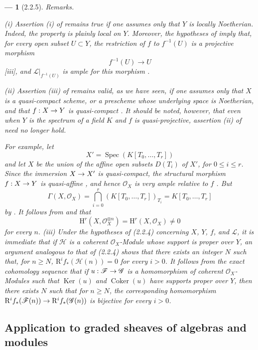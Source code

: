 \documentclass[oneside]{amsart}
\theoremstyle{ega-env-style}
\newtheorem*{env}{---}
\theoremstyle{ega-thm-env-style}
\theoremstyle{ega-defn-env-style}
\def\mathcal{\mathscr}
\def\sh{\mathcal}                   %
\def\leq{\leqslant}                 %
\def\geq{\geqslant}                 %
\def\HH{\mathrm{H}}                 %
\def\RR{\mathrm{R}}                 %
\def\Ker{\operatorname{Ker}}
\def\Coker{\operatorname{Coker}}
\def\Spec{\operatorname{Spec}}
\renewcommand{\to}{\mathchoice{\longrightarrow}{\rightarrow}{\rightarrow}{\rightarrow}}
\let\EGAOriginalLabel\label
\renewcommand{\label}[1]{\phantomsection\EGAOriginalLabel{#1}}
\begin{document}
\begin{env}[2.2.5]
\label{III.2.2.5}
\emph{Remarks.}

(i) Assertion (i) of  remains true if one assumes only that $Y$ is \emph{locally Noetherian}.
Indeed, the property is plainly local on $Y$.
Moreover, the hypotheses of  imply that, for every open subset $U\subset Y$, the restriction of $f$ to $f^{-1}(U)$ is a projective morphism
\[
  f^{-1}(U)\longrightarrow U
\]
[iii], and $\sh{L}|_{f^{-1}(U)}$ is ample for this morphism .

(ii) Assertion (iii) of  remains valid, as we have seen, if one assumes only that $X$ is a quasi-compact scheme, or a prescheme whose underlying space is Noetherian, and that $f:X\to Y$ is quasi-compact .
It should be noted, however, that even when $Y$ is the \emph{spectrum of a field} $K$ and $f$ is \emph{quasi-projective}, assertion (ii) of  need no longer hold.

For example, let
\[
  X'=\Spec(K[T_0,\ldots,T_r])
\]
and let $X$ be the union of the affine open subsets $D(T_i)$ of $X'$, for $0\leq i\leq r$.
Since the immersion $X\to X'$ is quasi-compact, the structural morphism $f:X\to Y$ is quasi-affine , and hence $\sh{O}_X$ is very ample relative to $f$ .
But
\[
  \Gamma(X,\sh{O}_X)
  =\bigcap_{i=0}^r(K[T_0,\ldots,T_r])_{T_i}
  =K[T_0,\ldots,T_r]
\]
by .
It follows from  and  that
\[
  \HH^r(X,\sh{O}_X^{\otimes n})
  =\HH^r(X,\sh{O}_X)
  \neq0
\]
for every $n$.
(iii) Under the hypotheses of (2.2.4) concerning $X$, $Y$, $f$, and $\sh{L}$,
it is immediate that if $\sh{H}$ is a coherent $\sh{O}_X$-Module whose support
is \emph{proper over $Y$}, an argument analogous to that of (2.2.4) shows
that there exists an integer $N$ such that, for $n\geq N$,
$\RR^if_*(\sh{H}(n))=0$ for every $i>0$. It follows from the exact
cohomology sequence that if $u:\sh{F}\to\sh{G}$ is a homomorphism of coherent
$\sh{O}_X$-Modules such that $\Ker(u)$ and $\Coker(u)$ have supports
\emph{proper over $Y$}, then there exists $N$ such that for $n\geq N$, the
corresponding homomorphism
$\RR^if_*(\sh{F}(n))\to\RR^if_*(\sh{G}(n))$ is \emph{bijective} for every
$i>0$.
\end{env}


\subsection{Application to graded sheaves of algebras and modules}
\label{subsection:III.2.3}
\end{document}
